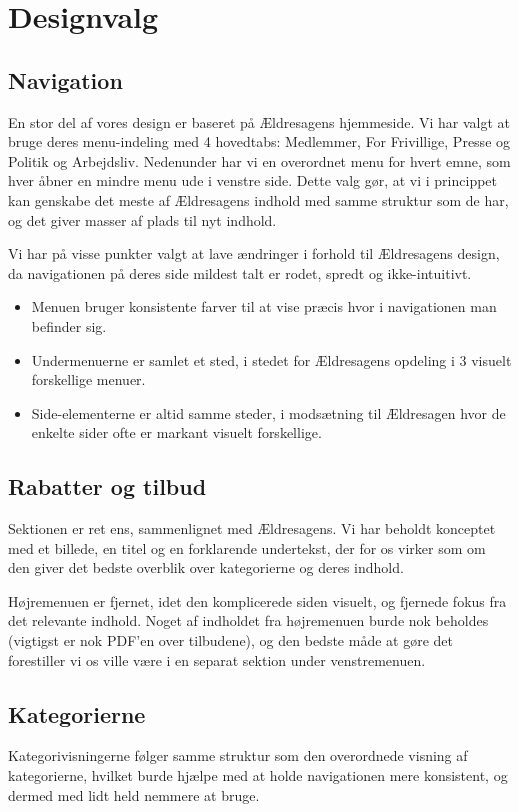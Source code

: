 \section{Designvalg}
\subsection{Navigation}
En stor del af vores design er baseret på Ældresagens hjemmeside. Vi har
valgt at bruge deres menu-indeling med 4 hovedtabs: Medlemmer, For Frivillige,
Presse og Politik og Arbejdsliv. Nedenunder har vi en overordnet menu for hvert
emne, som hver åbner en mindre menu ude i venstre side. Dette valg gør, at vi i
princippet kan genskabe det meste af Ældresagens indhold med samme struktur som de
har, og det giver masser af plads til nyt indhold. 

Vi har på visse punkter valgt at lave ændringer i forhold til Ældresagens design, da
navigationen på deres side mildest talt er rodet, spredt og ikke-intuitivt. 

\begin{itemize}
\item Menuen bruger konsistente farver til at vise præcis hvor i navigationen man befinder sig.
\item Undermenuerne er samlet et sted, i stedet for Ældresagens opdeling i 3 visuelt forskellige menuer.
\item Side-elementerne er altid samme steder, i modsætning til Ældresagen hvor de enkelte sider
      ofte er markant visuelt forskellige.
\end{itemize}

\subsection{Rabatter og tilbud}
Sektionen er ret ens, sammenlignet med Ældresagens. Vi har beholdt konceptet med et billede, en titel og en forklarende undertekst, der for os virker som om den giver det bedste overblik over kategorierne og deres indhold.

Højremenuen er fjernet, idet den komplicerede siden visuelt, og fjernede fokus fra det relevante indhold.
Noget af indholdet fra højremenuen burde nok beholdes (vigtigst er nok PDF'en over tilbudene), og den bedste måde at gøre det forestiller vi os ville være i en separat sektion under venstremenuen. 

\subsection{Kategorierne}
Kategorivisningerne følger samme struktur som den overordnede visning af kategorierne, hvilket burde hjælpe med at holde navigationen mere konsistent, og dermed med lidt held nemmere at bruge. 

